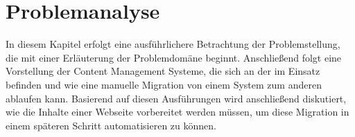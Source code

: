 \chapter{Problemanalyse}
    In diesem Kapitel erfolgt
    eine ausführlichere Betrachtung der Problemstellung,
    die mit einer Erläuterung der Problemdomäne beginnt.
    Anschließend folgt eine Vorstellung der Content Management Systeme,
    die sich an der {\fernUni} im Einsatz befinden
    und wie eine manuelle Migration von einem System zum anderen
    ablaufen kann.
    Basierend auf diesen Ausführungen wird anschließend diskutiert,
    wie die Inhalte einer Webseite vorbereitet werden müssen,
    um diese Migration in einem späteren Schritt automatisieren zu können.

    \label{chapter:ProblemAnalysis}
    
    
    
    
    
